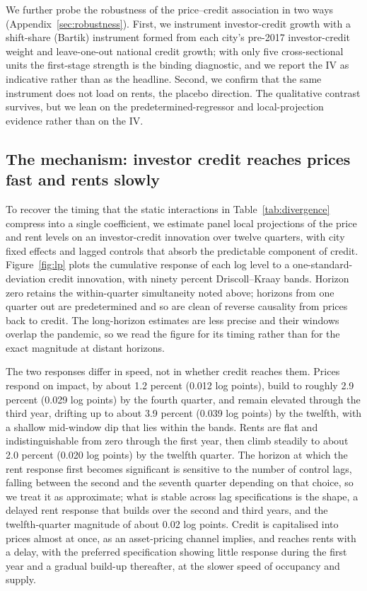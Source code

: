 \documentclass[preprint,11pt,authoryear]{elsarticle}
\begin{document}
We further probe the robustness of the price--credit association in two ways
(Appendix~\ref{sec:robustness}). First, we instrument investor-credit growth with a
shift-share (Bartik) instrument formed from each city's pre-2017 investor-credit
weight and leave-one-out national credit growth; with only five cross-sectional
units the first-stage strength is the binding diagnostic, and we report the IV as
indicative rather than as the headline. Second, we confirm that the same instrument
does not load on rents, the placebo direction. The qualitative contrast survives,
but we lean on the predetermined-regressor and local-projection evidence rather than
on the IV.

\subsection{The mechanism: investor credit reaches prices fast and rents slowly}
\label{sec:mechanism}

To recover the timing that the static interactions in Table~\ref{tab:divergence}
compress into a single coefficient, we estimate panel local projections of the price
and rent levels on an investor-credit innovation over twelve quarters, with city
fixed effects and lagged controls that absorb the predictable component of credit.
Figure~\ref{fig:lp} plots the cumulative response of each log level to a
one-standard-deviation credit innovation, with ninety percent Driscoll--Kraay bands.
Horizon zero retains the within-quarter simultaneity noted above; horizons from one
quarter out are predetermined and so are clean of reverse causality from prices back
to credit. The long-horizon estimates are less precise and their windows overlap the
pandemic, so we read the figure for its timing rather than for the exact magnitude
at distant horizons.

The two responses differ in speed, not in whether credit reaches them. Prices
respond on impact, by about 1.2 percent (0.012 log points), build to roughly
2.9 percent (0.029 log points) by the fourth quarter, and remain elevated through
the third year, drifting up to about 3.9 percent (0.039 log points) by the twelfth,
with a shallow mid-window
dip that lies within the bands. Rents are flat and
indistinguishable from zero through the first year, then climb steadily to
about 2.0 percent (0.020 log points) by the twelfth quarter. The horizon
at which the rent response first becomes significant is sensitive to the
number of control lags, falling between the second and the seventh quarter
depending on that choice, so we treat it as approximate; what is stable
across lag specifications is the shape, a delayed rent response that builds
over the second and third years, and the twelfth-quarter magnitude of about
0.02 log points. Credit is capitalised into prices almost at once, as an asset-pricing
channel implies, and reaches rents with a delay, with the preferred specification
showing little response during the first year and a gradual build-up thereafter, at the
slower speed of occupancy and supply.
\end{document}
